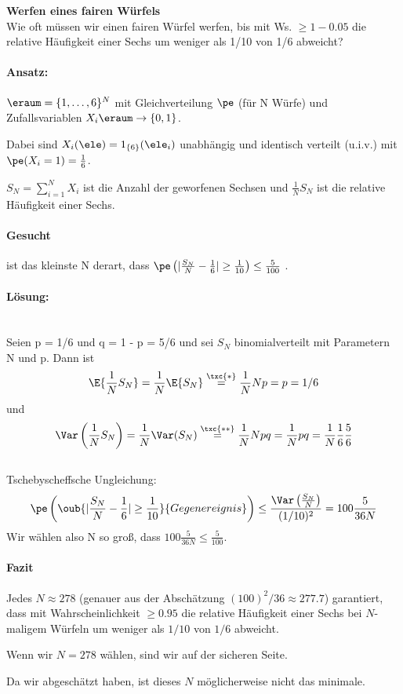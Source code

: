 \begin{bsp}
    \textbf{Werfen eines fairen Würfels} \\
    Wie oft müssen wir einen fairen Würfel werfen, bis mit Ws. $\geq 1  - 0.05$ die relative Häufigkeit einer Sechs um weniger als 1/10 von 1/6 abweicht?
    \paragraph{Ansatz:} $\eraum = \{1, \dots, 6\}^N$ mit Gleichverteilung $\pe$ (für N Würfe) und Zufallsvariablen
    $X_i \eraum \rightarrow \{0,1\}$.

    Dabei sind $X_i(\ele) = 1_{\{6\}} (\ele_i)$ unabhängig und identisch verteilt (u.i.v.) mit $\pe(X_i = 1) = \frac{1}{6}$.

    $S_N = \sum^N_{i=1} X_i$ ist die Anzahl der geworfenen Sechsen und $\frac{1}{N} S_N$ ist die relative
    Häufigkeit einer Sechs.
    \paragraph{Gesucht} ist das kleinste N derart, dass $ \pe\left(| \frac{S_N}{N} - \frac{1}{6}| \geq \frac{1}{10}\right) \leq \frac{5}{100}$
    .
    \paragraph{Lösung:}  \\
    Seien p = 1/6 und q = 1 - p = 5/6 und sei $S_N$ binomialverteilt mit Parametern N und p.
    Dann ist
    \[
        \E{ \frac{1}{N}  S_N} = \frac{1}{N} \E{S_N} \overset{\txc{*}}{=}  \frac{1}{N} Np  = p = 1/6
    \]
    und
    \[
        \Var\left(\frac{1}{N}  S_N\right) = \frac{1}{N} \Var(S_N) \overset{\txc{**}}{=} \frac{1}{N} Npq = \frac{1}{N} pq = \frac{1}{N} \frac{1}{6} \frac{5}{6}
    \]
     \\
    Tschebyscheffsche Ungleichung:
    \[
        \pe\left(
        \oub{
            | \frac{S_N}{N} - \frac{1}{6} | \geq \frac{1}{10}
        }{Gegenereignis}
        \right)
        \leq 
        \frac{\Var\left(\frac{S_N}{N}\right)}{(1/10)^2} = 100 \frac{5}{36 N}
    \]
    Wir wählen also N so groß, dass $100 \frac{5}{36 N} \leq \frac{5}{100}$.
    \paragraph{Fazit}
    Jedes $N \approx 278$ (genauer aus der Abschätzung $(100)^2/36 \approx 277.7$) garantiert, dass mit
    Wahrscheinlichkeit $\geq 0.95$ die relative Häufigkeit einer Sechs bei $N$-maligem Würfeln um weniger als $1/10$
    von $1/6$ abweicht.

    Wenn wir $N = 278$ wählen, sind wir auf der sicheren Seite.

    Da wir abgeschätzt haben, ist dieses $N$ möglicherweise nicht das minimale.
\end{bsp}

